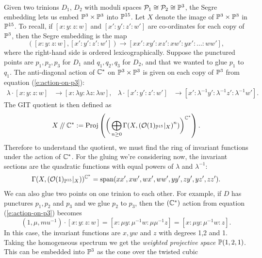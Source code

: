 	Given two trinions $D_1$, $D_2$ with moduli spaces $\mathcal{P}_1 \cong \mathcal{P}_2 \cong \mathbb{P}^3$, the Segre embedding lets us embed $\mathbb{P}^3 \times \mathbb{P}^3$ into $\mathbb{P}^{15}$. Let $X$ denote the image of $\mathbb{P}^3 \times \mathbb{P}^3$ in $\mathbb{P}^{15}$. To recall, if $[x:y:z:w]$ and $[x':y':z':w']$ are co-ordinates for each copy of $\mathbb{P}^3$, then the Segre embedding is the map
	\begin{equation}
	\label{e:segre}
	([x:y:z:w], [x':y':z':w']) \to [xx':xy':xz':xw':yx':...:ww'],
	\end{equation}
	where the right-hand side is ordered lexicographically. Suppose the punctured points are ${p_1,p_2,p_3}$ for $D_1$ and ${q_1,q_2,q_3}$ for $D_2$, and that we wanted to glue $p_1$ to $q_1$. The anti-diagonal action of $\mathbb{C}^\ast$ on $\mathbb{P}^3\times \mathbb{P}^3$ is given on each copy of $\mathbb{P}^3$ from equation (\ref{e:action-on-p3}):
	\begin{align*}
		\lambda \cdot [x:y:z:w] &\to [x:\lambda y:\lambda z:\lambda w], & \lambda \cdot [x':y':z':w'] &\to [x':\lambda^{-1} y':\lambda^{-1} z':\lambda^{-1}w'].
	\end{align*}
	The GIT quotient is then defined as
	\begin{equation}
	X\mathbin{/\mkern-4mu/} \mathbb{C}^\ast := \text{Proj}\left(\bigg(\bigoplus_{n\geq 0} \Gamma(X, \left(\mathcal{O}(1)_{\mathbb{P}^{15}}|_X\right)^n)\bigg)^{\mathbb{C}^\ast}\right).
	\end{equation}
	Therefore to understand the quotient, we must find the ring of invariant functions under the action of $\mathbb{C}^\ast$. For the gluing we're considering now, the invariant sections are the quadratic functions with equal powers of $\lambda$ and $\lambda^{-1}$:
	\begin{equation}
		\Gamma(X, \left(\mathcal{O}(1)_{\mathbb{P}^{15}}|_X\right))^{\mathbb{C}^\ast} = \text{span}(xx',xw',wx',ww',yy',zy',yz',zz').
	\end{equation}
	We can also glue two points on one trinion to each other. For example, if $D$ has punctures $p_1,p_2$ and $p_3$ and we glue $p_2$ to $p_3$, then the $(\mathbb{C}^\ast)$ action from equation (\ref{e:action-on-p3}) becomes
	\begin{equation}
		(1,\mu, mu^{-1})\cdot [x:y:z:w] = [x:\mu y: \mu^{-1}w: \mu\mu^{-1}z] = [x:\mu y:\mu^{-1}w:z].
	\end{equation}
	In this case, the invariant functions are $x,yw$ and $z$ with degrees 1,2 and 1. Taking the homogeneous spectrum we get the \emph{weighted projective space} $\mathbb{P}(1,2,1)$. This can be embedded into $\mathbb{P}^3$ as the cone over the twisted cubic \cite[Ex. 1.1]{reid_graded_2002}
		
